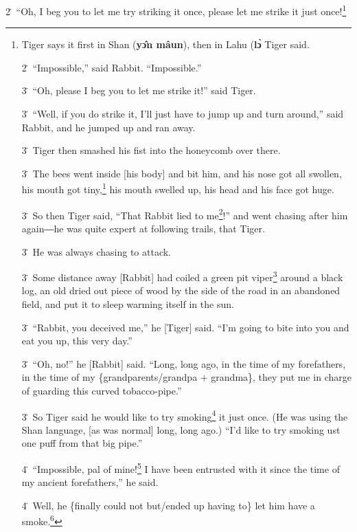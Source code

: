 2\. ``Oh, I beg you to let me try striking it once, please let me strike it just
once!\footnote{Tiger says it first in Shan (\textbf{yɔ̂n mâun}), then in Lahu (\textbf{lɔ̀} Tiger said.

2\. ``Impossible,'' said Rabbit. ``Impossible.''

3\. ``Oh, please I beg you to let me strike it!'' said Tiger.

3\. ``Well, if you do strike it, I'll just have to jump up and turn around,'' said
Rabbit, and he jumped up and ran away.

3\. Tiger then smashed his fist into the honeycomb over there.

3\. The bees went inside [his body] and bit him, and his nose got all swollen,
his mouth got tiny,\footnote{Because of the stings around his mouth, his oral orifice was almost completely} his mouth swelled up, his head and his face got huge.

3\. So then Tiger said, ``That Rabbit lied to me\footnote{Lit. ``lies to people,'' but the non-3\textsuperscript{rd} person benefactive}!'' and went chasing after
him again―he was quite expert at following trails, that Tiger.

3\. He was always chasing to attack.

3\. Some distance away [Rabbit] had coiled a green pit viper\footnote{\textbf{ vɨ̀-nɔ }\textit{Trimeresurus popeorum}. Only slightly venomous,} around a black
log, an old dried out piece of wood by the side of the road in an abandoned field,
and put it to sleep warming itself in the sun.

3\. ``Rabbit, you deceived me,'' he [Tiger] said. ``I'm going to bite into you
and eat you up, this very day.''

3\. ``Oh, no!'' he [Rabbit] said. ``Long, long ago, in the time of my forefathers,
in the time of my \{grandparents/grandpa + grandma\}, they put me in charge of
guarding this curved tobacco-pipe.''

3\. So Tiger said he would like to try smoking\footnote{He uses a Lahuized Shan loanword \textbf{lùʔ} for `smoke'.} it just once. (He was using
the Shan language, [as was normal] long, long ago.) ``I'd like to try smoking ust
one puff from that big pipe.''

4\. ``Impossible, pal of mine!\footnote{Rabbit uses the friendly Shan-derived word \textbf{šahÁy} `buddy; pal',} I have been entrusted with it since the time
of my ancient forefathers,'' he said.

4\. Well, he \{finally could not but/ended up having to\} let him have a smoke.\footnote{\textbf{ tɔ}: causative of \textbf{dɔ̀ }`drink; smoke (tobacco)', like}

}
